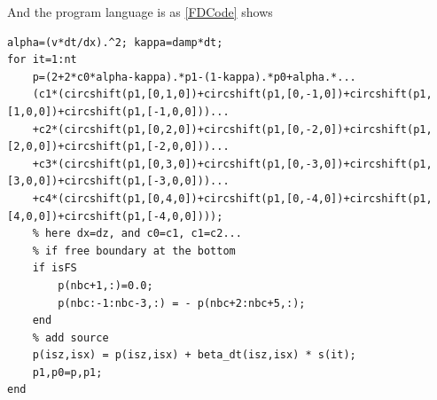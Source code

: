 \documentclass[a4paper, UTF8]{article}
\begin{document}
		And the program language is as \autoref{FDCode} shows
		\begin{lstlisting}[caption=set ABC to the velocity variable (2 is same), label=FDCode,basicstyle=\tiny, numberstyle=\tiny]
% 
alpha=(v*dt/dx).^2; kappa=damp*dt;
for it=1:nt
	p=(2+2*c0*alpha-kappa).*p1-(1-kappa).*p0+alpha.*...
	(c1*(circshift(p1,[0,1,0])+circshift(p1,[0,-1,0])+circshift(p1,[1,0,0])+circshift(p1,[-1,0,0]))...
	+c2*(circshift(p1,[0,2,0])+circshift(p1,[0,-2,0])+circshift(p1,[2,0,0])+circshift(p1,[-2,0,0]))...
	+c3*(circshift(p1,[0,3,0])+circshift(p1,[0,-3,0])+circshift(p1,[3,0,0])+circshift(p1,[-3,0,0]))...
	+c4*(circshift(p1,[0,4,0])+circshift(p1,[0,-4,0])+circshift(p1,[4,0,0])+circshift(p1,[-4,0,0]))); 
	% here dx=dz, and c0=c1, c1=c2...
	% if free boundary at the bottom
	if isFS
		p(nbc+1,:)=0.0;
		p(nbc:-1:nbc-3,:) = - p(nbc+2:nbc+5,:);
	end
	% add source
	p(isz,isx) = p(isz,isx) + beta_dt(isz,isx) * s(it);
	p1,p0=p,p1;
end
    	\end{lstlisting}
\end{document}
